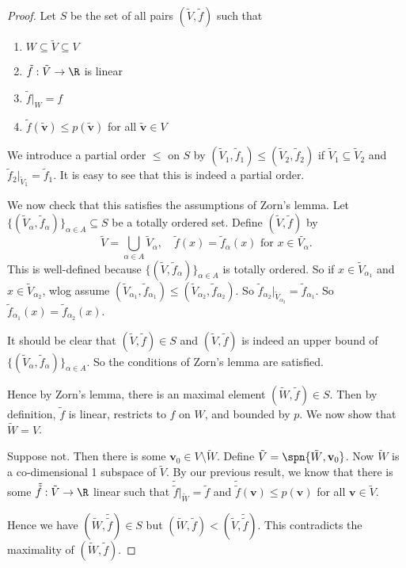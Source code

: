 \documentclass[a4paper]{article}
\begin{document}
\begin{proof}
  Let $S$ be the set of all pairs $(\tilde{V}, \tilde{f})$ such that
  \begin{enumerate}
    \item $W\subseteq \tilde{V}\subseteq V$
    \item $\tilde{f}: \tilde{V} \to \R$ is linear
    \item $\tilde{f}|_W = f$
    \item $\tilde{f}(\tilde{\mathbf{v}}) \leq p(\tilde{\mathbf{v}})$ for all $\tilde{\mathbf{v}} \in V$
  \end{enumerate}

  We introduce a partial order $\leq$ on $S$ by $(\tilde{V}_1, \tilde{f}_1) \leq (\tilde{V}_2, \tilde{f}_2)$ if $\tilde{V}_1 \subseteq \tilde{V}_2$  and $\tilde{f}_2 |_{\tilde{V}_1} = \tilde{f}_1$. It is easy to see that this is indeed a partial order.

  We now check that this satisfies the assumptions of Zorn's lemma. Let $\{(\tilde{V}_\alpha, \tilde{f}_\alpha)\}_{\alpha\in A} \subseteq S$ be a totally ordered set. Define $(\tilde{V}, \tilde{f})$ by
  \[
    \tilde{V} = \bigcup_{\alpha\in A} \tilde{V}_\alpha,\quad \tilde{f}(x) = \tilde{f}_\alpha(x)\text{ for }x\in \tilde{V_\alpha}.
  \]
  This is well-defined because $\{(\tilde{V}, \tilde{f}_\alpha)\}_{\alpha\in A}$ is totally ordered. So if $x\in \tilde{V}_{\alpha_1}$ and $x \in \tilde{V}_{\alpha_2}$, wlog assume $(\tilde{V}_{\alpha_1}, \tilde{f}_{\alpha_1}) \leq (\tilde{V}_{\alpha_2}, \tilde{f}_{\alpha_2})$. So $\tilde{f}_{\alpha_2}|_{\tilde{V}_{\alpha_2}} = \tilde{f}_{\alpha_1}$. So $\tilde{f}_{\alpha_1}(x) = \tilde{f}_{\alpha_2}(x)$.

  It should be clear that $(\tilde{V}, \tilde{f})\in S$ and $(\tilde{V}, \tilde{f})$ is indeed an upper bound of $\{(\tilde{V}_\alpha, \tilde{f}_\alpha)\}_{\alpha\in A}$. So the conditions of Zorn's lemma are satisfied.

  Hence by Zorn's lemma, there is an maximal element $(\tilde{W}, \tilde{f}) \in S$. Then by definition, $\tilde{f}$ is linear, restricts to $f$ on $W$, and bounded by $p$. We now show that $\tilde{W} = V$.

  Suppose not. Then there is some $\mathbf{v}_0 \in V\setminus \tilde{W}$. Define $\tilde{V} = \spn\{\tilde{W}, \mathbf{v}_0\}$. Now $\tilde{W}$ is a co-dimensional 1 subspace of $\tilde{V}$. By our previous result, we know that there is some $\tilde{\tilde{f}}: \tilde{V} \to \R$ linear such that $\tilde{\tilde{f}}|_{\tilde{W}} = \tilde{f}$ and $\tilde{\tilde{f}}(\mathbf{v}) \leq p(\mathbf{v})$ for all $\mathbf{v}\in \tilde{V}$.

  Hence we have $(\tilde{W}, \tilde{\tilde{f}}) \in S$ but $(\tilde{W}, \tilde{f}) < (\tilde{V}, \tilde{\tilde{f}})$. This contradicts the maximality of $(\tilde{W}, \tilde{f})$.
\end{proof}
\end{document}
